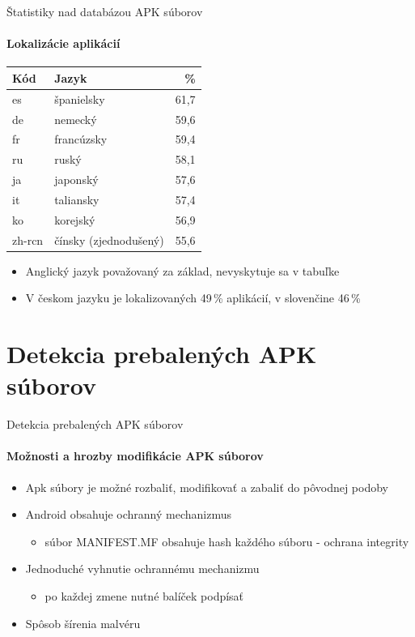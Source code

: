 \documentclass{beamer}
\begin{document}
     \begin{frame}[label=lists]{Štatistiky nad databázou APK súborov}
  \framesubtitle{Lokalizácie aplikácií}
\begin{table}[htb]
\centering
  \begin{tabular}{l l r}
    \textbf{Kód} & \textbf{Jazyk} &  \textbf{\%} \\\hline
    es & španielsky & 61,7 \\
    de & nemecký & 59,6 \\
    fr & francúzsky & 59,4 \\
    ru & ruský & 58,1 \\
    ja & japonský & 57,6 \\
    it & taliansky & 57,4 \\
	ko & korejský & 56,9 \\
	zh-rcn & čínsky (zjednodušený) & 55,6\\
    \hline
  \end{tabular}
  \label{tab:language}
\end{table}
\begin{itemize}
\item Anglický jazyk považovaný za základ, nevyskytuje sa v tabuľke
\item V českom jazyku je lokalizovaných 49\,\% aplikácií, v slovenčine 46\,\%
\end{itemize}
\end{frame}

\section{Detekcia prebalených APK súborov}
  \begin{frame}[label=lists]{Detekcia prebalených APK súborov}
 	 \framesubtitle{Možnosti a hrozby modifikácie APK súborov}
	\begin{itemize}
	 	\item Apk súbory je možné rozbaliť, modifikovať a zabaliť do pôvodnej podoby
	 	\item Android obsahuje ochranný mechanizmus
	 	 \begin{itemize}
	 	 	\item súbor MANIFEST.MF obsahuje hash každého súboru - ochrana 	integrity
		 \end{itemize}	 
		 \item Jednoduché vyhnutie ochrannému mechanizmu 
	 	 \begin{itemize}
	 	 	\item po každej zmene nutné balíček podpísať
		 \end{itemize}	 
		 \item Spôsob šírenia malvéru	  
	\end{itemize}
  \end{frame} 
  
\end{document}
